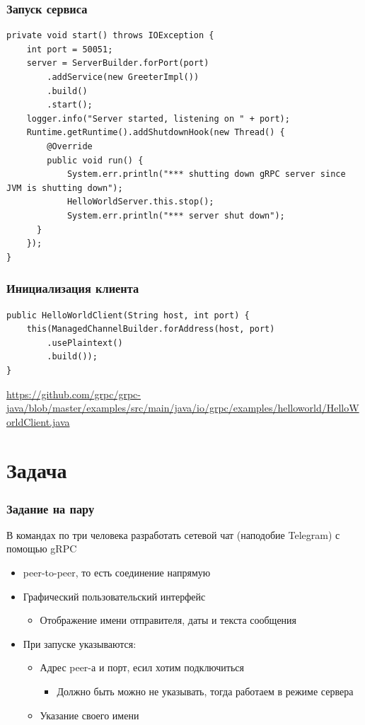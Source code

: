 \documentclass[xetex,mathserif,serif]{beamer}
\begin{document}
	\begin{frame}[fragile]
		\frametitle{Запуск сервиса}
		\begin{footnotesize}
			\begin{verbatim}
private void start() throws IOException {
    int port = 50051;
    server = ServerBuilder.forPort(port)
        .addService(new GreeterImpl())
        .build()
        .start();
    logger.info("Server started, listening on " + port);
    Runtime.getRuntime().addShutdownHook(new Thread() {
        @Override
        public void run() {
            System.err.println("*** shutting down gRPC server since JVM is shutting down");
            HelloWorldServer.this.stop();
            System.err.println("*** server shut down");
      }
    });
}
			\end{verbatim}
		\end{footnotesize}
	\end{frame}

	\begin{frame}[fragile]
		\frametitle{Инициализация клиента}
		\begin{verbatim}
public HelloWorldClient(String host, int port) {
    this(ManagedChannelBuilder.forAddress(host, port)
        .usePlaintext()
        .build());
}
		\end{verbatim}
		\vspace{5mm}
		\url{https://github.com/grpc/grpc-java/blob/master/examples/src/main/java/io/grpc/examples/helloworld/HelloWorldClient.java}
	\end{frame}

	\section{Задача}

	\begin{frame}
		\frametitle{Задание на пару}
		В командах по три человека разработать сетевой чат (наподобие Telegram) с помощью gRPC
		\begin{itemize}
			\item peer-to-peer, то есть соединение напрямую
			\item Графический пользовательский интерфейс
			\begin{itemize}
				\item Отображение имени отправителя, даты и текста сообщения
			\end{itemize}
			\item При запуске указываются:
			\begin{itemize}
				\item Адрес peer-а и порт, есил хотим подключиться
				\begin{itemize}
					\item Должно быть можно не указывать, тогда работаем в режиме сервера
				\end{itemize}
				\item Указание своего имени
			\end{itemize}
		\end{itemize}
	\end{frame}
\end{document}
